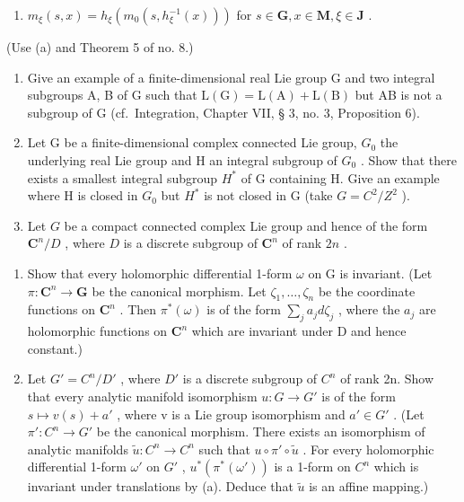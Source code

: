 \begin{enumerate}
\def\labelenumi{(\roman{enumi})}
\setcounter{enumi}{1}
\tightlist
\item
  \(m_{\xi}(s,x) = h_{\xi}(m_0(s,h_{\xi}^{-1}(x)))\) for \(s\in \mathbf{G}, x\in \mathbf{M},\xi \in \mathbf{J}\) .
\end{enumerate}

(Use (a) and Theorem 5 of no. 8.)

\begin{enumerate}
\def\labelenumi{\arabic{enumi}.}
\setcounter{enumi}{27}
\item
  Give an example of a finite-dimensional real Lie group G and two integral subgroups A, B of G such that \(\mathrm{L}(\mathrm{G})=\mathrm{L}(\mathrm{A})+\mathrm{L}(\mathrm{B})\) but AB is not a subgroup of G (cf.~Integration, Chapter VII, § 3, no. 3, Proposition 6).
\item
  Let G be a finite-dimensional complex connected Lie group, \(G_{0}\) the underlying real Lie group and H an integral subgroup of \(G_{0}\) . Show that there exists a smallest integral subgroup \(H^{*}\) of G containing H. Give an example where H is closed in \(G_{0}\) but \(H^{*}\) is not closed in G (take \(G = C^{2}/Z^{2}\) ).
\item
  Let \(G\) be a compact connected complex Lie group and hence of the form \(\mathbf{C}^n / D\) , where \(D\) is a discrete subgroup of \(\mathbf{C}^n\) of rank \(2n\) .
\end{enumerate}

\begin{enumerate}
\def\labelenumi{(\alph{enumi})}
\item
  Show that every holomorphic differential 1-form \(\omega\) on G is invariant. (Let \(\pi: \mathbf{C}^n \to \mathbf{G}\) be the canonical morphism. Let \(\zeta_1, \ldots, \zeta_n\) be the coordinate functions on \(\mathbf{C}^n\) . Then \(\pi^*(\omega)\) is of the form \(\sum_j a_j d\zeta_{j}\) , where the \(a_j\) are holomorphic functions on \(\mathbf{C}^n\) which are invariant under D and hence constant.)
\item
  Let \(G' = C^{n}/D'\) , where \(D'\) is a discrete subgroup of \(C^{n}\) of rank 2n. Show that every analytic manifold isomorphism \(u: G \to G'\) is of the form \(s \mapsto v(s) + a'\) , where v is a Lie group isomorphism and \(a' \in G'\) . (Let \(\pi': C^{n} \to G'\) be the canonical morphism. There exists an isomorphism of analytic manifolds \(\tilde{u}: C^{n} \to C^{n}\) such that \(u \circ \pi' \circ \tilde{u}\) . For every holomorphic differential 1-form \(\omega'\) on \(G'\) , \(u^*(\pi^*(\omega'))\) is a 1-form on \(C^{n}\) which is invariant under translations by (a). Deduce that \(\tilde{u}\) is an affine mapping.)
\end{enumerate}

